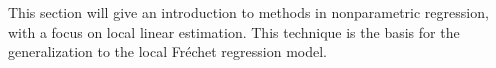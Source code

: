 This section will give an introduction to methods in nonparametric regression,
with a focus on local linear estimation. This technique is the basis for
the generalization to the local Fréchet regression model.
